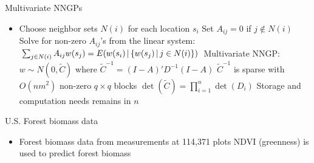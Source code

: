 \begin{frame}{Multivariate NNGPs}
\begin{itemize}
\item Choose neighbor sets $N(i)$ for each location $s_i$
\myitem Set $A_{ij}=0$ if $j \notin N(i)$
\myitem Solve for non-zero $A_{ij}$'s from the  linear system: $\sum_{j \in N(i)} A_{ij}w(s_j) = E(w(s_i) \,|\, \{ w(s_j) \,|\, j \in N(i) \})$
\myitem \alert{Multivariate NNGP:} $w \sim N(0, \tilde C)$ where $\tilde C^{-1} = (I-A)' D^{-1} (I-A)$
\myitem $\tilde C^{-1}$ is sparse with $O(nm^2)$ non-zero $q \times q$ blocks
\myitem $\det(\tilde C) = \prod_{i=1}^n \det(D_i)$
\myitem Storage and computation needs remains  in $n$
\end{itemize}
\end{frame}

\begin{frame}{U.S. Forest biomass data}
\begin{figure}[]
\begin{center}
\vskip-4mm
\end{center}
\end{figure}
\begin{itemize}
\item Forest biomass data from measurements at 114,371 plots
\myitem NDVI (greenness) is used to predict forest biomass
\end{itemize}
\end{frame}

